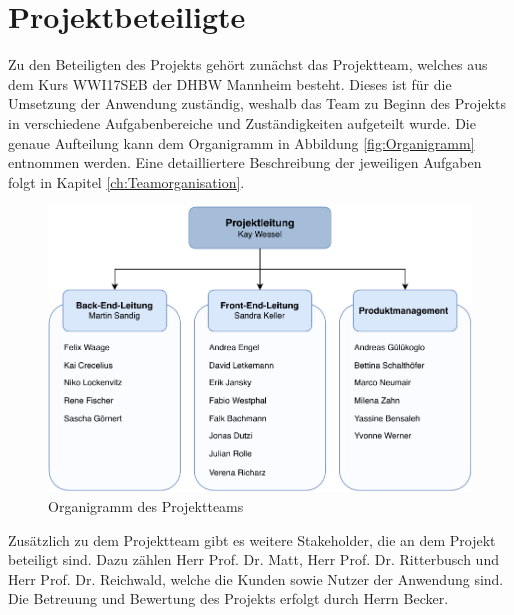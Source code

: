 \section{Projektbeteiligte}
Zu den Beteiligten des Projekts gehört zunächst das Projektteam, welches aus dem Kurs WWI17SEB der \ac{DHBW} Mannheim besteht.
Dieses ist für die Umsetzung der Anwendung zuständig, weshalb das Team zu Beginn des Projekts in verschiedene Aufgabenbereiche und Zuständigkeiten aufgeteilt wurde.
Die genaue Aufteilung kann dem Organigramm in Abbildung \vref{fig:Organigramm} entnommen werden.
Eine detailliertere Beschreibung der jeweiligen Aufgaben folgt in Kapitel \vref{ch:Teamorganisation}. 

\begin{figure}[h]
	\centering 
	\includegraphics[width=12cm]{img/Organigramm.pdf}
	\captionsetup{format=hang}
	\caption[Organigramm des Projektteams]{\label{fig:Organigramm}Organigramm des Projektteams}
\end{figure}

Zusätzlich zu dem Projektteam gibt es weitere Stakeholder, die an dem Projekt beteiligt sind.
Dazu zählen Herr Prof. Dr. Matt, Herr Prof. Dr. Ritterbusch und Herr Prof. Dr. Reichwald, welche die Kunden sowie Nutzer der Anwendung sind.
Die Betreuung und Bewertung des Projekts erfolgt durch Herrn Becker.



 
